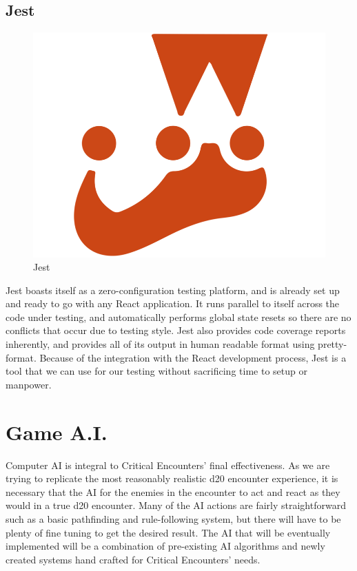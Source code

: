 \documentclass[12pt,a4paper]{report}
\begin{document}
		\subsection{Jest}
		\begin{figure}
			\includegraphics[scale=.13]{jest}
			\caption{Jest}
			\label{fig: Jest}
		\end{figure}
		Jest boasts itself as a zero-configuration testing platform, and is already set up and ready to go with any React application. It runs parallel to itself across the code under testing, and automatically performs global state resets so there are no conflicts that occur due to testing style. Jest also provides code coverage reports inherently, and provides all of its output in human readable format using pretty-format. Because of the integration with the React development process, Jest is a tool that we can use for our testing without sacrificing time to setup or manpower.\cite{jest}
	\newpage
	\section{Game A.I.}
		Computer AI is integral to Critical Encounters' final effectiveness. As we are trying to replicate the most reasonably realistic d20 encounter experience, it is necessary that the AI for the enemies in the encounter to act and react as they would in a true d20 encounter. Many of the AI actions are fairly straightforward such as a basic pathfinding and rule-following system, but there will have to be plenty of fine tuning to get the desired result. The AI that will be eventually implemented will be a combination of pre-existing AI algorithms and newly created systems hand crafted for Critical Encounters' needs.
\end{document}
